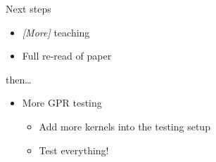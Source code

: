 \documentclass[presentation]{beamer}
\begin{document}
\begin{frame}[label={sec:orgb1c507c}]{Next steps}
\begin{itemize}
\item \emph{[More]} teaching
\item Full re-read of paper
\end{itemize}
\vfill

then\ldots{}

\vfill
\begin{itemize}
\item More GPR testing
\begin{itemize}
\item Add more kernels into the testing setup
\item Test everything!
\end{itemize}
\end{itemize}
\end{frame}
\end{document}
